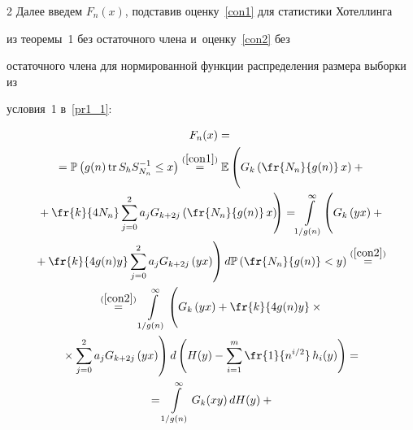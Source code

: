 \begin{multicols}{2}
Далее введем $F_n(x)$, подставив оценку~\eqref{con1} для статистики Хотеллинга 


из теоремы~1 без остаточного члена и~оценку~\eqref{con2} без 


остаточного члена для нормированной функции распределения размера выборки из 


условия~1 в~\eqref{pr1_1}:


\begin{multline}


\label{pr1_2}


F_n(x)={}\\


{}=\mathbb{P} \left( g(n) \,\mathrm{tr}\, S_h S^{-1}_{N_n} \leq x \right)


\stackrel{(\ref{con1})}{=}


 \mathbb{E}\left( 


 \vphantom{\sum\limits_{j=0}^{2}}


 G_k\left(\fr{N_n}{g(n)}\,x \right) + {}\right.\\


\left. {}+


\fr{k}{4N_n}\sum\limits_{j=0}^{2}a_j G_{k+2j}\left(\fr{N_n}{g(n)}\,x \right)\! \!\right) 


= \! \int\limits_{1/g(n)}^{\infty}\!\left( 


\vphantom{\sum\limits_{j=0}^{2}}


G_k\left(yx \right) + {}\right.\\


\left.{}+


\fr{k}{4g(n)y}\sum\limits_{j=0}^{2}a_j G_{k+2j}\left(yx \right) \right) 


d\mathbb{P}\left( \fr{N_n}{g(n)} < y \right)  \stackrel{(\ref{con2})}{=}{} \\


{}\stackrel{(\ref{con2})}{=} \int\limits_{1/g(n)}^{\infty}\left(


\vphantom{\sum\limits_{j=0}^{2}} 


G_k\left(yx \right) + 


\fr{k}{4g(n)y}\times{}\right.\\


\left.{}\times \sum\limits_{j=0}^{2}a_j G_{k+2j}\left(yx \right) 


\right) d\left( H(y) - \sum\limits_{i=1}^{m}\fr{1}{n^{i/2}}\, h_i(y) \right) 


={}\\


{}=\int\limits^{\infty}_{1/g(n)} G_k(xy)\,dH(y) + {}\\



\end{multline}
\end{multicols}
